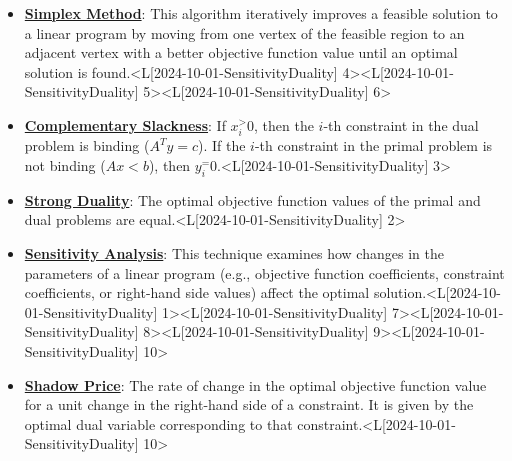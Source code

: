 \documentclass{article}%
\begin{document}
\begin{itemize}[[leftmargin=*]]%
\item \href{https://www.math.purdue.edu/~yipn/421/2024-10-01-SensitivityDuality.pdf#page=4}{\textbf{Simplex Method}}: This algorithm iteratively improves a feasible solution to a linear program by moving from one vertex of the feasible region to an adjacent vertex with a better objective function value until an optimal solution is found.<L[2024-10-01-SensitivityDuality] 4><L[2024-10-01-SensitivityDuality] 5><L[2024-10-01-SensitivityDuality] 6>%
\item \href{https://www.math.purdue.edu/~yipn/421/2024-10-01-SensitivityDuality.pdf#page=3}{\textbf{Complementary Slackness}}: If $x_i^ > 0$, then the $i$-th constraint in the dual problem is binding ($A^T y = c$). If the $i$-th constraint in the primal problem is not binding ($Ax < b$), then $y_i^ = 0$.<L[2024-10-01-SensitivityDuality] 3>%
\item \href{https://www.math.purdue.edu/~yipn/421/2024-10-01-SensitivityDuality.pdf#page=2}{\textbf{Strong Duality}}: The optimal objective function values of the primal and dual problems are equal.<L[2024-10-01-SensitivityDuality] 2>%
\item \href{https://www.math.purdue.edu/~yipn/421/2024-10-01-SensitivityDuality.pdf#page=1}{\textbf{Sensitivity Analysis}}: This technique examines how changes in the parameters of a linear program (e.g., objective function coefficients, constraint coefficients, or right-hand side values) affect the optimal solution.<L[2024-10-01-SensitivityDuality] 1><L[2024-10-01-SensitivityDuality] 7><L[2024-10-01-SensitivityDuality] 8><L[2024-10-01-SensitivityDuality] 9><L[2024-10-01-SensitivityDuality] 10>%
\item \href{https://www.math.purdue.edu/~yipn/421/2024-10-01-SensitivityDuality.pdf#page=10}{\textbf{Shadow Price}}: The rate of change in the optimal objective function value for a unit change in the right-hand side of a constraint. It is given by the optimal dual variable corresponding to that constraint.<L[2024-10-01-SensitivityDuality] 10>%
\end{itemize}%
\end{document}
